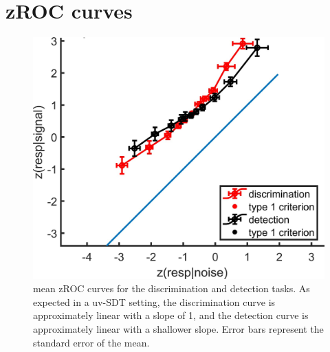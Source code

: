 \documentclass[12pt,twoside]{reedthesis}
\begin{document}
\hypertarget{app3:zROC}{%
\section{zROC curves}\label{app3:zROC}}
\begin{figure}[H]
\includegraphics[width=\linewidth]{figure/fMRI/zROC} \caption[zROC curves, imaging experiment]{mean zROC curves for the discrimination and detection tasks. As expected in a uv-SDT setting, the discrimination curve is approximately linear with a slope of 1, and the detection curve is approximately linear with a shallower slope. Error bars represent the standard error of the mean.}\label{fig:zROC}
\end{figure}
\newpage
\end{document}
